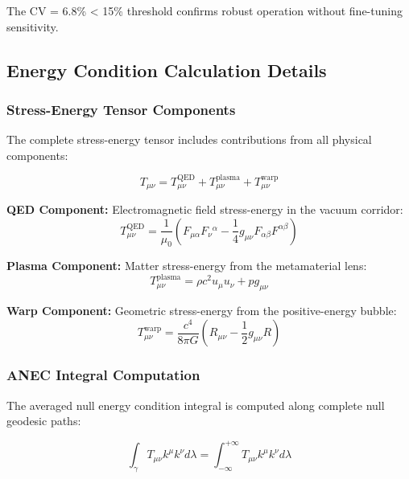 \documentclass[aps,prl,reprint,groupedaddress,floatfix]{revtex4-1}
\begin{document}
The CV = 6.8\% < 15\% threshold confirms robust operation without fine-tuning sensitivity.

\subsection{Energy Condition Calculation Details}

\subsubsection{Stress-Energy Tensor Components}

The complete stress-energy tensor includes contributions from all physical components:

\begin{equation}
T_{\mu\nu} = T_{\mu\nu}^{\text{QED}} + T_{\mu\nu}^{\text{plasma}} + T_{\mu\nu}^{\text{warp}} \label{eq:total_stress_energy}
\end{equation}

\textbf{QED Component:} Electromagnetic field stress-energy in the vacuum corridor:
\begin{equation}
T_{\mu\nu}^{\text{QED}} = \frac{1}{\mu_0}\left(F_{\mu\alpha}F_\nu{}^\alpha - \frac{1}{4}g_{\mu\nu}F_{\alpha\beta}F^{\alpha\beta}\right) \label{eq:qed_stress_energy}
\end{equation}

\textbf{Plasma Component:} Matter stress-energy from the metamaterial lens:
\begin{equation}
T_{\mu\nu}^{\text{plasma}} = \rho c^2 u_\mu u_\nu + p g_{\mu\nu} \label{eq:plasma_stress_energy}
\end{equation}

\textbf{Warp Component:} Geometric stress-energy from the positive-energy bubble:
\begin{equation}
T_{\mu\nu}^{\text{warp}} = \frac{c^4}{8\pi G}(R_{\mu\nu} - \frac{1}{2}g_{\mu\nu}R) \label{eq:warp_stress_energy}
\end{equation}

\subsubsection{ANEC Integral Computation}

The averaged null energy condition integral is computed along complete null geodesic paths:

\begin{equation}
\int_\gamma T_{\mu\nu} k^\mu k^\nu d\lambda = \int_{-\infty}^{+\infty} T_{\mu\nu} k^\mu k^\nu d\lambda \label{eq:anec_integral}
\end{equation}
\end{document}
